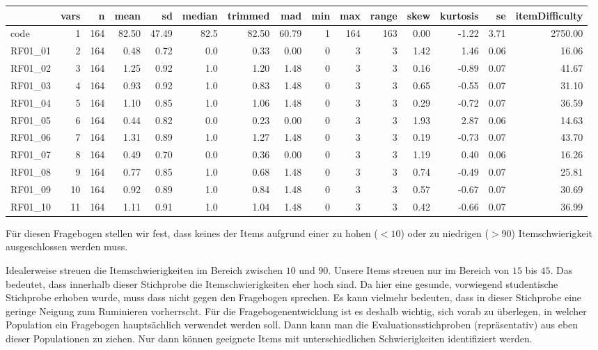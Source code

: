 \documentclass[
  ngerman,
]{book}
\begin{document}
\begin{tabular}{l|r|r|r|r|r|r|r|r|r|r|r|r|r|r}
\hline
  & vars & n & mean & sd & median & trimmed & mad & min & max & range & skew & kurtosis & se & itemDifficulty\\
\hline
code & 1 & 164 & 82.50 & 47.49 & 82.5 & 82.50 & 60.79 & 1 & 164 & 163 & 0.00 & -1.22 & 3.71 & 2750.00\\
\hline
RF01\_01 & 2 & 164 & 0.48 & 0.72 & 0.0 & 0.33 & 0.00 & 0 & 3 & 3 & 1.42 & 1.46 & 0.06 & 16.06\\
\hline
RF01\_02 & 3 & 164 & 1.25 & 0.92 & 1.0 & 1.20 & 1.48 & 0 & 3 & 3 & 0.16 & -0.89 & 0.07 & 41.67\\
\hline
RF01\_03 & 4 & 164 & 0.93 & 0.92 & 1.0 & 0.83 & 1.48 & 0 & 3 & 3 & 0.65 & -0.55 & 0.07 & 31.10\\
\hline
RF01\_04 & 5 & 164 & 1.10 & 0.85 & 1.0 & 1.06 & 1.48 & 0 & 3 & 3 & 0.29 & -0.72 & 0.07 & 36.59\\
\hline
RF01\_05 & 6 & 164 & 0.44 & 0.82 & 0.0 & 0.23 & 0.00 & 0 & 3 & 3 & 1.93 & 2.87 & 0.06 & 14.63\\
\hline
RF01\_06 & 7 & 164 & 1.31 & 0.89 & 1.0 & 1.27 & 1.48 & 0 & 3 & 3 & 0.19 & -0.73 & 0.07 & 43.70\\
\hline
RF01\_07 & 8 & 164 & 0.49 & 0.70 & 0.0 & 0.36 & 0.00 & 0 & 3 & 3 & 1.19 & 0.40 & 0.06 & 16.26\\
\hline
RF01\_08 & 9 & 164 & 0.77 & 0.85 & 1.0 & 0.68 & 1.48 & 0 & 3 & 3 & 0.74 & -0.49 & 0.07 & 25.81\\
\hline
RF01\_09 & 10 & 164 & 0.92 & 0.89 & 1.0 & 0.84 & 1.48 & 0 & 3 & 3 & 0.57 & -0.67 & 0.07 & 30.69\\
\hline
RF01\_10 & 11 & 164 & 1.11 & 0.91 & 1.0 & 1.04 & 1.48 & 0 & 3 & 3 & 0.42 & -0.66 & 0.07 & 36.99\\
\hline
\end{tabular}

Für diesen Fragebogen stellen wir fest, dass keines der Items aufgrund einer zu hohen (\(<10\)) oder zu niedrigen (\(>90\)) Itemschwierigkeit ausgeschlossen werden muss.

Idealerweise streuen die Itemschwierigkeiten im Bereich zwischen \(10\) und \(90\). Unsere Items streuen nur im Bereich von \(15\) bis \(45\). Das bedeutet, dass innerhalb dieser Stichprobe die Itemschwierigkeiten eher hoch sind. Da hier eine gesunde, vorwiegend studentische Stichprobe erhoben wurde, muss dass nicht gegen den Fragebogen sprechen. Es kann vielmehr bedeuten, dass in dieser Stichprobe eine geringe Neigung zum Ruminieren vorherrscht. Für die Fragebogenentwicklung ist es deshalb wichtig, sich vorab zu überlegen, in welcher Population ein Fragebogen hauptsächlich verwendet werden soll. Dann kann man die Evaluationsstichproben (repräsentativ) aus eben dieser Populationen zu ziehen. Nur dann können geeignete Items mit unterschiedlichen Schwierigkeiten identifiziert werden.
\end{document}
